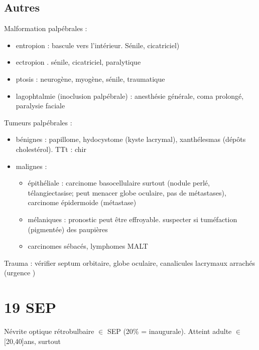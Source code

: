 \documentclass[11pt]{article}
\begin{document}
\subsection{Autres}
\label{sec:org8ebc086}
Malformation palpébrales : 
\begin{itemize}
\item entropion : bascule vers l'intérieur. Sénile, cicatriciel)
\item ectropion . sénile, cicatriciel, paralytique
\item ptosis : neurogène, myogène, sénile, traumatique
\item lagophtalmie (inoclusion palpébrale) : anesthésie générale, coma prolongé,
paralysie faciale
\end{itemize}
Tumeurs palpébrales :
\begin{itemize}
\item bénignes : papillome, hydocystome (kyste lacrymal), xanthélesmas (dépôts
cholestérol). TTt : chir
\item malignes : 
\begin{itemize}
\item épithéliale : carcinome basocellulaire surtout (nodule perlé,
télangiectasise; peut menacer globe oculaire, pas de métastases), carcinome
épidermoide (métastase)
\item mélaniques : pronostic peut être effroyable. suspecter si tuméfaction
(pigmentée) des paupières
\item carcinomes sébacés, lymphomes MALT
\end{itemize}
\end{itemize}
Trauma : vérifier septum orbitaire, globe oculaire, canalicules lacrymaux
arrachés (urgence \skull)

\section{19 SEP}
\label{sec:orgd70c474}
Névrite optique rétrobulbaire \(\in\) SEP (20\% = inaugurale). Atteint adulte \(\in\)
[20,40]ans, surtout \female
\end{document}
